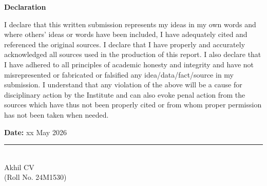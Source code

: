 \newpage
\begin{center}
    {\LARGE \textbf{Declaration}}
\end{center}

\vspace{1em}

\noindent
I declare that this written submission represents my ideas in my own words and where others’ ideas or words have been included, I have adequately cited and referenced the original sources. I declare that I have properly and accurately acknowledged all sources used in the production of this report. I also declare that I have adhered to all principles of academic honesty and integrity and have not misrepresented or fabricated or falsified any idea/data/fact/source in my submission. I understand that any violation of the above will be a cause for disciplinary action by the Institute and can also evoke penal action from the sources which have thus not been properly cited or from whom proper permission has not been taken when needed.

\vspace{2cm}

\noindent
\begin{minipage}[t]{0.5\textwidth}
    \textbf{Date:} xx May 2026
\end{minipage}%
\begin{minipage}[t]{0.5\textwidth}
    \raggedleft
    \rule{5cm}{0.4pt}\\
    Akhil CV\\
    (Roll No. 24M1530)
\end{minipage}

